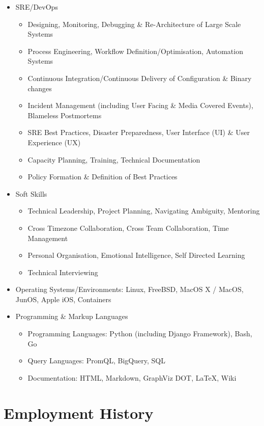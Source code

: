 \documentclass[a4paper, 10pt] {article}
\begin{document}
\begin{itemize}[noitemsep]
\item SRE/DevOps
  \begin{itemize}[noitemsep]
  \item Designing, Monitoring, Debugging \& Re-Architecture of Large Scale Systems
  \item Process Engineering, Workflow Definition/Optimisation, Automation Systems
  \item Continuous Integration/Continuous Delivery of Configuration \& Binary changes
  \item Incident Management (including User Facing \& Media Covered Events), Blameless Postmortems
  \item SRE Best Practices, Disaster Preparedness, User Interface (UI) \& User Experience (UX)
  \item Capacity Planning, Training, Technical Documentation
  \item Policy Formation \& Definition of Best Practices
  \end{itemize}
\item Soft Skills
  \begin{itemize}[noitemsep]
  \item Technical Leadership, Project Planning, Navigating Ambiguity, Mentoring
  \item Cross Timezone Collaboration, Cross Team Collaboration, Time Management
  \item Personal Organisation, Emotional Intelligence, Self Directed Learning
  \item Technical Interviewing
  \end{itemize}
  \item Operating Systems/Environments: Linux, FreeBSD, MacOS X / MacOS, JunOS, Apple iOS, Containers
\item Programming \& Markup Languages
  \begin{itemize}[noitemsep]
  \item Programming Languages: Python (including Django Framework), Bash, Go
  \item Query Languages: PromQL, BigQuery, SQL
  \item Documentation: HTML, Markdown, GraphViz DOT, \LaTeX, Wiki
  \end{itemize}
\end{itemize}  

\newpage

\section*{Employment History}
\end{document}
